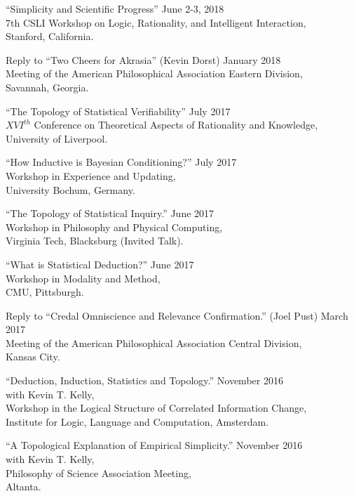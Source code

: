\documentclass[12pt]{res} %
\begin{document}
\begin{resume}
``Simplicity and Scientific Progress'' \hfill June 2-3, 2018\\
7th CSLI Workshop on Logic, Rationality, and Intelligent Interaction,\\
Stanford, California.

Reply to ``Two Cheers for Akrasia'' (Kevin Dorst) \hfill January 2018\\
Meeting of the American Philosophical Association Eastern Division,\\ 
Savannah, Georgia.

``The Topology of Statistical Verifiability'' \hfill July 2017\\
$XVI^{th}$ Conference on Theoretical Aspects of Rationality and Knowledge,\\
University of Liverpool. 

``How Inductive is Bayesian Conditioning?'' \hfill July 2017\\
Workshop in Experience and Updating,\\
University Bochum, Germany.

``The Topology of Statistical Inquiry.'' \hfill June 2017\\
Workshop in Philosophy and Physical Computing, \\
Virginia Tech, Blacksburg (Invited Talk).

``What is Statistical Deduction?'' \hfill June 2017\\
Workshop in Modality and Method, \\
CMU, Pittsburgh.

Reply to ``Credal Omniscience and Relevance Confirmation.'' (Joel Pust) \hfill March 2017\\
Meeting of the American Philosophical Association Central Division,\\ 
Kansas City.

``Deduction, Induction, Statistics and Topology.'' \hfill November 2016\\
with Kevin T. Kelly,\\
 Workshop in the Logical Structure of Correlated Information Change,\\ Institute for Logic, Language and Computation, Amsterdam.

``A Topological Explanation of Empirical Simplicity.'' \hfill November 2016\\
with Kevin T. Kelly,\\
Philosophy of Science Association Meeting, \\
Altanta.


\end{resume}
\end{document}
